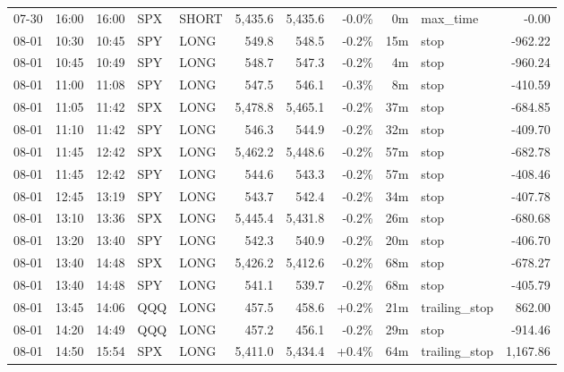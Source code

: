 \documentclass[11pt,a4paper,twoside]{article}
\begin{document}
\begin{center}
\begin{longtable}{>{\color{txtmain}}l l l l l r r r r >{\color{txtmain}}l r}
07-30 & 16:00 & 16:00 & SPX & SHORT & 5,435.6 & 5,435.6 & \textcolor{lossred}{-0.0\%} & 0m & max\_time & \textcolor{lossred}{-0.00} \\
08-01 & 10:30 & 10:45 & SPY & LONG & 549.8 & 548.5 & \textcolor{lossred}{-0.2\%} & 15m & stop & \textcolor{lossred}{-962.22} \\
08-01 & 10:45 & 10:49 & SPY & LONG & 548.7 & 547.3 & \textcolor{lossred}{-0.2\%} & 4m & stop & \textcolor{lossred}{-960.24} \\
08-01 & 11:00 & 11:08 & SPY & LONG & 547.5 & 546.1 & \textcolor{lossred}{-0.3\%} & 8m & stop & \textcolor{lossred}{-410.59} \\
08-01 & 11:05 & 11:42 & SPX & LONG & 5,478.8 & 5,465.1 & \textcolor{lossred}{-0.2\%} & 37m & stop & \textcolor{lossred}{-684.85} \\
08-01 & 11:10 & 11:42 & SPY & LONG & 546.3 & 544.9 & \textcolor{lossred}{-0.2\%} & 32m & stop & \textcolor{lossred}{-409.70} \\
08-01 & 11:45 & 12:42 & SPX & LONG & 5,462.2 & 5,448.6 & \textcolor{lossred}{-0.2\%} & 57m & stop & \textcolor{lossred}{-682.78} \\
08-01 & 11:45 & 12:42 & SPY & LONG & 544.6 & 543.3 & \textcolor{lossred}{-0.2\%} & 57m & stop & \textcolor{lossred}{-408.46} \\
08-01 & 12:45 & 13:19 & SPY & LONG & 543.7 & 542.4 & \textcolor{lossred}{-0.2\%} & 34m & stop & \textcolor{lossred}{-407.78} \\
08-01 & 13:10 & 13:36 & SPX & LONG & 5,445.4 & 5,431.8 & \textcolor{lossred}{-0.2\%} & 26m & stop & \textcolor{lossred}{-680.68} \\
08-01 & 13:20 & 13:40 & SPY & LONG & 542.3 & 540.9 & \textcolor{lossred}{-0.2\%} & 20m & stop & \textcolor{lossred}{-406.70} \\
08-01 & 13:40 & 14:48 & SPX & LONG & 5,426.2 & 5,412.6 & \textcolor{lossred}{-0.2\%} & 68m & stop & \textcolor{lossred}{-678.27} \\
08-01 & 13:40 & 14:48 & SPY & LONG & 541.1 & 539.7 & \textcolor{lossred}{-0.2\%} & 68m & stop & \textcolor{lossred}{-405.79} \\
08-01 & 13:45 & 14:06 & QQQ & LONG & 457.5 & 458.6 & \textcolor{wingreen}{+0.2\%} & 21m & trailing\_stop & \textcolor{wingreen}{862.00} \\
08-01 & 14:20 & 14:49 & QQQ & LONG & 457.2 & 456.1 & \textcolor{lossred}{-0.2\%} & 29m & stop & \textcolor{lossred}{-914.46} \\
08-01 & 14:50 & 15:54 & SPX & LONG & 5,411.0 & 5,434.4 & \textcolor{wingreen}{+0.4\%} & 64m & trailing\_stop & \textcolor{wingreen}{1,167.86} \\

\end{longtable}
\end{center}
\end{document}
